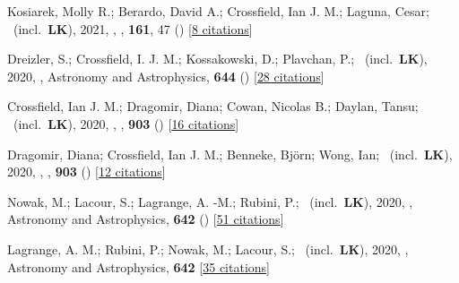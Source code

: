 \item[{\color{numcolor}\scriptsize47}] Kosiarek, Molly R.; Berardo, David A.; Crossfield, Ian J. M.; Laguna, Cesar; \etal\ (incl.\ \textbf{LK}), 2021, , \aj, \textbf{161}, 47 () [\href{https://ui.adsabs.harvard.edu/abs/2021AJ....161...47K}{8 citations}]

\item[{\color{numcolor}\scriptsize46}] Dreizler, S.; Crossfield, I. J. M.; Kossakowski, D.; Plavchan, P.; \etal\ (incl.\ \textbf{LK}), 2020, , Astronomy and Astrophysics, \textbf{644} () [\href{https://ui.adsabs.harvard.edu/abs/2020A&A...644A.127D}{28 citations}]

\item[{\color{numcolor}\scriptsize45}] Crossfield, Ian J. M.; Dragomir, Diana; Cowan, Nicolas B.; Daylan, Tansu; \etal\ (incl.\ \textbf{LK}), 2020, , \apj, \textbf{903} () [\href{https://ui.adsabs.harvard.edu/abs/2020ApJ...903L...7C}{16 citations}]

\item[{\color{numcolor}\scriptsize44}] Dragomir, Diana; Crossfield, Ian J. M.; Benneke, Bj{\"o}rn; Wong, Ian; \etal\ (incl.\ \textbf{LK}), 2020, , \apj, \textbf{903} () [\href{https://ui.adsabs.harvard.edu/abs/2020ApJ...903L...6D}{12 citations}]

\item[{\color{numcolor}\scriptsize43}] Nowak, M.; Lacour, S.; Lagrange, A. -M.; Rubini, P.; \etal\ (incl.\ \textbf{LK}), 2020, , Astronomy and Astrophysics, \textbf{642} () [\href{https://ui.adsabs.harvard.edu/abs/2020A&A...642L...2N}{51 citations}]

\item[{\color{numcolor}\scriptsize42}] Lagrange, A. M.; Rubini, P.; Nowak, M.; Lacour, S.; \etal\ (incl.\ \textbf{LK}), 2020, , Astronomy and Astrophysics, \textbf{642} [\href{https://ui.adsabs.harvard.edu/abs/2020A&A...642A..18L}{35 citations}]


